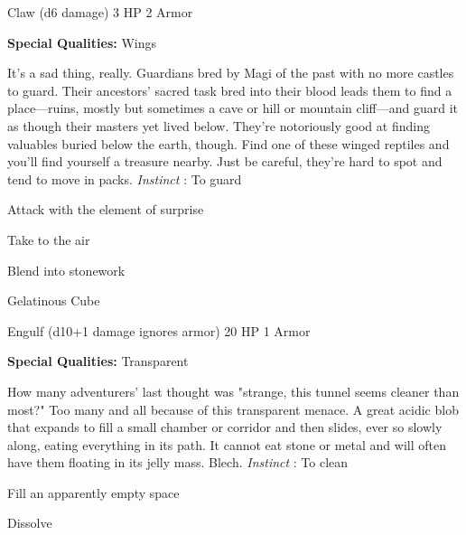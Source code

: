 Claw (d6 damage)	3 HP	2 Armor

 


 
\startMonsterQualities
{\bf Special Qualities:}  Wings
\stopMonsterQualities
 
\startMonsterDescription
It’s a sad thing, really. Guardians bred by Magi of the past with no more castles to guard. Their ancestors’ sacred task bred into their blood leads them to find a place—ruins, mostly but sometimes a cave or hill or mountain cliff—and guard it as though their masters yet lived below. They’re notoriously good at finding valuables buried below the earth, though. Find one of these winged reptiles and you’ll find yourself a treasure nearby. Just be careful, they’re hard to spot and tend to move in packs. {\em Instinct} : To guard
\stopMonsterDescription
 
\startitemize[1,packed]

\item Attack with the element of surprise

 
\item Take to the air

 
\item Blend into stonework


\stopitemize
 
\startMonsterName
Gelatinous Cube	 
\stopMonsterName
 

Engulf (d10+1 damage ignores armor)	20 HP	1 Armor

 


 
\startMonsterQualities
{\bf Special Qualities:}  Transparent
\stopMonsterQualities
 
\startMonsterDescription
How many adventurers’ last thought was "strange, this tunnel seems cleaner than most?" Too many and all because of this transparent menace. A great acidic blob that expands to fill a small chamber or corridor and then slides, ever so slowly along, eating everything in its path. It cannot eat stone or metal and will often have them floating in its jelly mass. Blech. {\em Instinct} : To clean
\stopMonsterDescription
 
\startitemize[1,packed]

\item Fill an apparently empty space

 
\item Dissolve


\stopitemize
 
